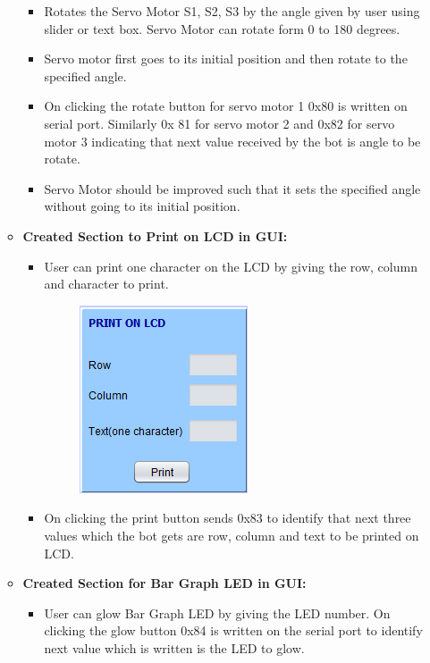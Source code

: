 \documentclass{article}
\begin{document}
\begin{enumerate}
\begin{itemize}
\begin{itemize}
\begin{figure}[h]
\begin{center}
			 		\end{center}
			 	\end{figure} 
			 	\item Rotates the Servo Motor S1, S2, S3 by the angle given by user using slider or text box. Servo Motor can rotate form 0 to 180 degrees.
			 	\item Servo motor first goes to its initial position and then rotate to the specified angle.
			 	\item On clicking the rotate button for servo motor 1 0x80 is written on serial port. Similarly 0x 81 for servo motor 2 and 0x82 for servo motor 3 indicating that next value received by the bot is angle to be rotate.
			 	\item Servo Motor should be improved such that it sets the specified angle without going to its initial position. 
			 \end{itemize}
			 \item \textbf{Created Section to Print on LCD in GUI:}
			 \begin{itemize}
			 	\item User can print one character on the LCD by giving the row, column and character to print. \\
			 	\begin{figure}[h]
			 		\begin{center}
			 			\includegraphics[scale=1]{lcd.png}
			 		\end{center}
			 	\end{figure}
			 	\item On clicking the print button sends 0x83 to identify that next three values which the bot gets are row, column and text to be printed on LCD. 
			 \end{itemize}
			 \newpage 
		   	 \item \textbf{Created Section for Bar Graph LED in GUI:} 
		   	 \begin{itemize}
		   	 	\item User can glow Bar Graph LED by giving the LED number. On clicking the glow button 0x84 is written on the serial port to identify next value which is written is the LED to glow.\\

\end{itemize}
\end{itemize}
\end{enumerate}
\end{document}
